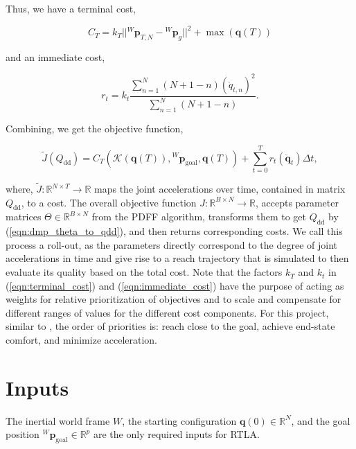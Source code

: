 \documentclass[10pt]{article}
\begin{document}
Thus, we have a terminal cost,

\begin{equation}
\label{eqn:terminal_cost}
	C_T = k_T ||{^W\mathbf{p}_{T, N}} - {^W}\mathbf{p}_{g}||^2 + \max(\mathbf{q}(T))
\end{equation}

and an immediate cost,

\begin{equation}
\label{eqn:immediate_cost}
	r_t  =  k_t \frac{\sum_{n=1}^N (N+1-n)(\ddot{q}_{t, n})^2}{\sum_{n=1}^N (N+1-n)}.
\end{equation}

Combining, we get the objective function,

\begin{equation}
	\tilde{J}(Q_{\text{dd}}) = C_T\left(\mathcal{K}(\mathbf{q}(T)), {^W}\mathbf{p}_{\text{goal}}, \mathbf{q}(T)\right) + \sum_{t=0}^T r_t(\ddot{\mathbf{q}}_t)\Delta t,
\end{equation}

where, $\tilde{J}: \mathbb{R}^{N \times T} \rightarrow \mathbb{R}$ maps the joint accelerations over time, contained in matrix $Q_{\text{dd}}$, to a cost. The overall objective function $J: \mathbb{R}^{B \times N} \rightarrow \mathbb{R}$, accepts parameter matrices $\Theta \in \mathbb{R}^{B \times N}$ from the PDFF algorithm, transforms them to get $Q_{\text{dd}}$ by (\ref{eqn:dmp_theta_to_qdd}), and then returns corresponding costs. We call this process a roll-out, as the parameters directly correspond to the degree of joint accelerations in time and give rise to a reach trajectory that is simulated to then evaluate its quality based on the total cost. Note that the factors $k_T$ and $k_t$ in (\ref{eqn:terminal_cost}) and (\ref{eqn:immediate_cost}) have the purpose of acting as weights for relative prioritization of objectives and to scale and compensate for different ranges of values for the different cost components. For this project, similar to \cite{pdff}, the order of priorities is: reach close to the goal, achieve end-state comfort, and minimize acceleration.

\section{Inputs}
The inertial world frame $W$, the starting configuration $\mathbf{q}(0) \in \mathbb{R}^N$, and the goal position ${^W}\mathbf{p}_{\text{goal}} \in \mathbb{R}^p$ are the only required inputs for RTLA.
\end{document}
